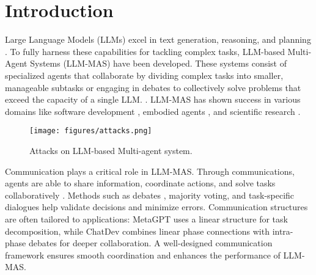 
\section{Introduction}



Large Language Models (LLMs) excel in text generation, reasoning, and planning \citep{zhao2023survey,wei2022chain,song2023llm, brown2020language}. To fully harness these capabilities for tackling complex tasks, LLM-based Multi-Agent Systems (LLM-MAS) have been developed. These systems consist of specialized agents that collaborate by dividing complex tasks into smaller, manageable subtasks or engaging in debates to collectively solve problems that exceed the capacity of a single LLM.
\citep{guo2024large, wu2023autogen, talebirad2023multi}. LLM-MAS has shown success in various domains like software development \citep{liu2024large, hong2023metagpt, qian2024chatdev}, embodied agents \citep{guo2024embodied, song2023llm}, and scientific research \citep{zheng2023chatgpt, tang2023medagents}.
\begin{figure}[t]
    \centering
    \texttt{[image: figures/attacks.png]}
    \caption{Attacks on LLM-based Multi-agent system.}
    \label{fig:attacks}
\end{figure}

Communication plays a critical role in LLM-MAS.
Through communications, agents are able to share information, coordinate actions, and solve tasks collaboratively \citep{qian2024scaling}. Methods such as debates \citep{du2023improving}, majority voting\citep{zhao2024electoral}, and task-specific dialogues \citep{hong2023metagpt} help validate decisions and minimize errors. Communication structures are often tailored to applications: MetaGPT \citep{hong2023metagpt} uses a linear structure for task decomposition, while ChatDev \citep{qian2024chatdev} combines linear phase connections with intra-phase debates for deeper collaboration. 
A well-designed communication framework ensures smooth coordination and enhances the performance of LLM-MAS.


